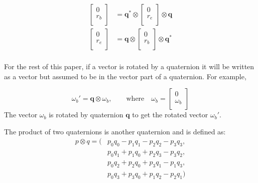 \documentclass{article}
\numberwithin{equation}{section} %
\newcommand{\bs}[1]{\boldsymbol{#1}}
\begin{document}
\begin{align}
	\begin{bmatrix}
		0 \\
		r_b \\
	\end{bmatrix}
	&=
	\bs{q}^* \otimes 
	\begin{bmatrix}
		0 \\
		r_e \\
	\end{bmatrix}
	\otimes \bs{q}	\\
	\begin{bmatrix}
		0 \\
		r_e \\
	\end{bmatrix}
	&=
	\bs{q} \otimes 
	\begin{bmatrix}
		0 \\
		r_b \\
	\end{bmatrix}
	\otimes \bs{q}^*	\\	
\end{align}	
		
For the rest of this paper, if a vector is rotated by a quaternion it will  be written as a vector but assumed to be in the vector part of a quaternion. For example,

\begin{equation}
	\omega_b' = \bs{q} \otimes \omega_b, \qquad 	\textrm{where} \quad
	\omega_b =	
	\begin{bmatrix}
		0 \\
		\omega_b \\
	\end{bmatrix}
\end{equation}
The vector $\omega_b$ is rotated by quaternion $\bs{q}$ to get the rotated vector $\omega_b'$.

The product of two quaternions is another quaternion and is defined as:
\begin{equation}
	\begin{split}
		p \otimes q =	( & p_0 q_0 - p_1 q_1 - p_2 q_2 - p_3 q_3, \\
							& p_0 q_1 + p_1 q_0 + p_2 q_3 - p_3 q_2,  \\
							& p_0 q_2 + p_2 q_0 + p_3 q_1 - p_1 q_3,  \\
							& p_0 q_3 + p_3 q_0 + p_1 q_2 - p_2 q_1 ) \\
	\end{split}
\end{equation}
\end{document}
